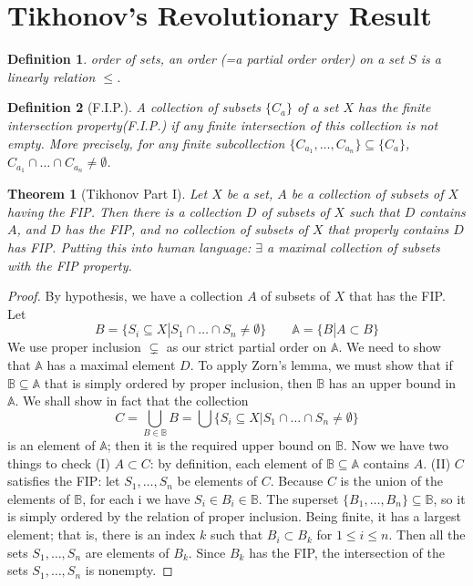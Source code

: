 \documentclass[article,11pt, reqno]{article}
\newtheorem*{theorem}{Theorem}
\newtheorem*{definition}{Definition}
\theoremstyle{remark}
\newcommand{\mb}{\mathbb}
\newcommand{\<}{\langle}
\renewcommand{\>}{\rangle}
\newcommand{\ex}{\exists}
\begin{document}
\section{Tikhonov's Revolutionary Result}
\begin{definition}
    order of sets, an order (=a partial order order) on a set $S$ is a linearly relation $\leq$.
\end{definition}
\begin{definition}[F.I.P.]
    A collection of subsets $\{C_a\}$ of a set $X$ has the finite intersection property(F.I.P.) if any finite intersection of this collection is not empty. More precisely, for any finite subcollection $\{C_{a_1},\dots,C_{a_n}\}\subseteq \{C_a\}$, $C_{a_1}\cap\dots\cap C_{a_n}\neq\emptyset$.
\end{definition}
\begin{theorem}[Tikhonov Part I]
    Let $X$ be a set, $A$ be a collection of subsets of $X$ having the FIP. Then there is a collection $D$ of subsets of $X$ such that $D$ contains $A$, and $D$ has the FIP, and no collection of subsets of $X$ that properly contains $D$ has FIP. Putting this into human language: $\ex$ a maximal collection of subsets with the FIP property.
\end{theorem}
\begin{proof}
    By hypothesis, we have a collection $A$ of subsets of $X$ that has the FIP. Let 
    $$
        B=\{S_i\subseteq X|S_1\cap\dots\cap S_n\neq\emptyset\}\qquad\mb A=\{B|A\subset B\}
    $$ 
    We use proper inclusion $\subsetneq$ as our strict partial order on $\mb A$. We need to show that $\mb A$ has a maximal element $D$. To apply Zorn’s lemma, we must show that if $\mb B \subseteq\mb A$ that is simply ordered by proper inclusion, then $\mb B$ has an upper bound in $\mb A$. We shall show in fact that the collection
    $$
        C=\bigcup_{B\in\mb B}B=\bigcup\{S_i\subseteq X|S_1\cap\dots\cap S_n\neq\emptyset\}
    $$
    is an element of $\mb A$; then it is the required upper bound on $\mb B$. Now we have two things to check (I) $A\subset C$: by definition, each element of $\mb B\subseteq \mb A$ contains $A$. (II) $C$ satisfies the FIP: let $S_1,\dots, S_n$ be elements of $C$. Because $C$ is the union of the elements of $\mb B$, for each i we have $S_i\in B_i\in\mb B$. The superset $\{B_1,\dots,B_n\}\subseteq\mb B$, so it is simply ordered by the relation of proper inclusion. Being finite, it has a largest element; that is, there is an index $k$ such that $B_i\subset B_k$ for $1\leq i\leq n$. Then all the sets $S_1,\dots,S_n$ are elements of $B_k$. Since $B_k$ has the FIP, the intersection of the sets $S_1,\dots,S_n$ is nonempty.
\end{proof}
\end{document}
